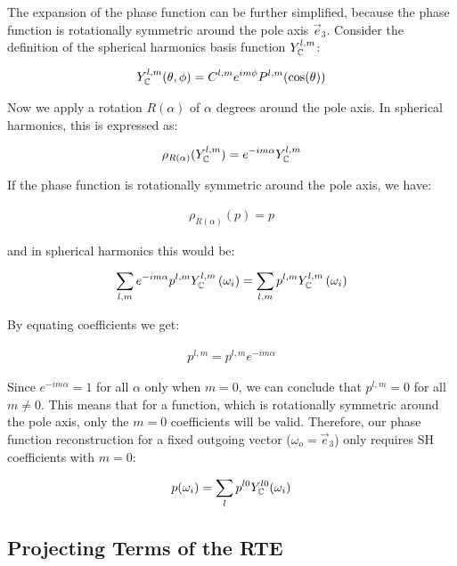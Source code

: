 \documentclass[10pt]{scrartcl}
\begin{document}
The expansion of the phase function can be further simplified, because the phase function is rotationally symmetric around the pole axis $\vec{e}_3$. Consider the definition of the spherical harmonics basis function $Y_{\mathbb{C}}^{l,m}$:

\begin{align*}
Y_{\mathbb{C}}^{l,m}(\theta, \phi) = C^{l,m}e^{im\phi}P^{l,m}(\operatorname{cos}(\theta))
\end{align*}

Now we apply a rotation $R(\alpha)$ of $\alpha$ degrees around the pole axis. In spherical harmonics, this is expressed as:

\begin{align*}
\rho_{R(\alpha)}(Y_{\mathbb{C}}^{l,m}) = e^{-i m\alpha}Y_{\mathbb{C}}^{l,m}
\end{align*}

If the phase function is rotationally symmetric around the pole axis, we have:

\begin{align*}
\rho_{R(\alpha)}(p) = p
\end{align*}

and in spherical harmonics this would be:

\begin{align*}
\sum_{l,m}
{
e^{-i m\alpha}
p^{l,m}
Y_{\mathbb{C}}^{l,m} }\left(\omega_i\right)
=
\sum_{l,m}
{
p^{l,m}
Y_{\mathbb{C}}^{l,m}\left(\omega_i\right)
}
\end{align*}

By equating coefficients we get:

\begin{align*}
p^{l,m} = p^{l,m}e^{-i m\alpha}
\end{align*}

Since $e^{-i m\alpha}=1$ for all $\alpha$ only when $m=0$, we can conclude that $p^{l,m} = 0$ for all $m\ne0$. This means that for a function, which is rotationally symmetric around the pole axis, only the $m=0$ coefficients will be valid. Therefore, our phase function reconstruction for a fixed outgoing vector ($\omega_o=\vec{e}_3$) only requires SH coefficients with $m=0$:

\begin{align}
\label{eq:sh_exp_phase}
p(\omega_i) =
\sum_l
{
p^{l0}
Y_{\mathbb{C}}^{l0}(\omega_i)
}
\end{align}
%


\subsection{Projecting Terms of the RTE}
\end{document}
